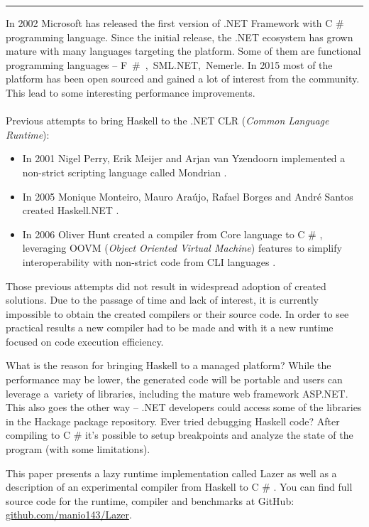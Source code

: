 \documentclass[en]{pracamgr}
\newcommand{\shrp}{%
  {\fontfamily{ppl}\selectfont\#%
  }}
\begin{document}
{
    \centering \rule[3pt]{9cm}{.3pt}

}

In 2002 Microsoft has released the first version of .NET Framework with
C\shrp{} programming language. Since the initial release, the .NET ecosystem
has grown mature with many languages targeting the platform. 
Some of them are functional programming languages -- \mbox{F\shrp{}, SML.NET, Nemerle}.
In 2015 most of the platform has been open sourced and gained a lot of
interest from the community. This lead to some interesting performance
improvements.\\ \\
Previous attempts to bring
Haskell to the .NET CLR (\textit{Common Language Runtime}):
\begin{itemize}
  \item
  In 2001 Nigel Perry, Erik Meijer and Arjan van Yzendoorn implemented a 
  non-strict scripting language called Mondrian
  \cite{MondrianImplDetails,PerryMeijer}.
  
  \item
  In 2005 Monique Monteiro, Mauro Ara\'ujo, Rafael Borges and Andr\'e Santos
  created Haskell.NET
  \cite{Brazil}.

  \item
  In 2006 Oliver Hunt created a compiler from Core language to C\shrp{}, leveraging
  OOVM (\textit{Object Oriented Virtual Machine}) features to simplify interoperability
  with non-strict code from CLI languages \cite{Hunt}.
\end{itemize}

Those previous attempts did not result in widespread adoption of created solutions.
Due to the passage of time and lack of interest, it is currently impossible
to obtain the created compilers or their source code.
In order to see practical results a new compiler had to be made
and with it a new runtime focused on code execution efficiency.

\newpage
What is the reason for bringing Haskell to a managed platform?
While the performance may be lower, the generated code will be portable
and users can leverage a~variety of libraries, including the mature web framework
ASP.NET. This also goes the other way -- .NET developers could access some of
the libraries in the Hackage package repository.
Ever tried debugging Haskell code? After compiling to C\shrp{} it's possible
to setup breakpoints and analyze the state of the program (with some limitations).

This paper presents a lazy runtime implementation called Lazer as well as
a description of an experimental compiler from Haskell to C\shrp{}.
You can find full source code for the runtime, compiler and benchmarks at GitHub:
\href{https://github.com/manio143/Lazer}{github.com/manio143/Lazer}.
\end{document}
